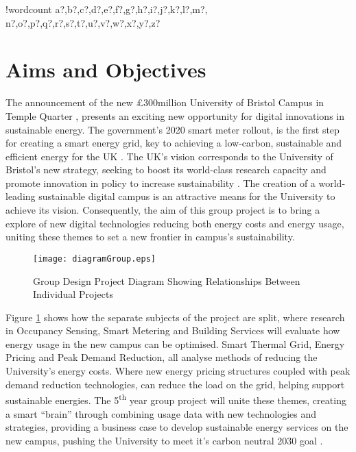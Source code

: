 \documentclass[fontsize=9.5pt]{extarticle}
\newcounter{words}
\newenvironment{counted}{%
  \setcounter{words}{0}
  \SearchList!{wordcount}{\stepcounter{words}}
    {a?,b?,c?,d?,e?,f?,g?,h?,i?,j?,k?,l?,m?,
    n?,o?,p?,q?,r?,s?,t?,u?,v?,w?,x?,y?,z?}
  \UndoBoundary{'}
  \SearchOrder{p;}}{%
  \StopSearching}
\begin{document}
\clearpage
\cfoot{\thepage}
\begin{counted} %
\section{Aims and Objectives}\label{aims-and-objectives}

The announcement of the new £300million University of Bristol Campus in
Temple Quarter \cite{November58:online}, presents an exciting new
opportunity for digital innovations in sustainable energy. The
government's 2020 smart meter rollout, is the first step for creating a
smart energy grid, key to achieving a low-carbon, sustainable and
efficient energy for the UK \cite{SmartEne79:online}. The UK's vision
corresponds to the University of Bristol's new strategy, seeking to
boost its world-class research capacity and promote innovation in policy
to increase sustainability \cite{universi93:online}. The creation of a
world-leading sustainable digital campus is an attractive means for the
University to achieve its vision. Consequently, the aim of this group
project is to bring a explore of new digital technologies reducing both
energy costs and energy usage, uniting these themes to set a new
frontier in campus's sustainability.

\begin{figure}[H]
\centering
\texttt{[image: diagramGroup.eps]}
\caption{Group Design Project Diagram Showing Relationships Between Individual Projects}
\vspace{-20pt}
\label{groupDia}
\end{figure}

Figure \ref{groupDia} shows how the separate subjects of the project are
split, where research in Occupancy Sensing, Smart Metering and Building
Services will evaluate how energy usage in the new campus can be
optimised. Smart Thermal Grid, Energy Pricing and Peak Demand Reduction,
all analyse methods of reducing the University's energy costs. Where new
energy pricing structures coupled with peak demand reduction
technologies, can reduce the load on the grid, helping support
sustainable energies. The 5\textsuperscript{th} year group project will
unite these themes, creating a smart ``brain'' through combining usage
data with new technologies and strategies, providing a business case to
develop sustainable energy services on the new campus, pushing the
University to meet it's carbon neutral 2030 goal
\cite{universi93:online}.


\end{counted}
\end{document}
